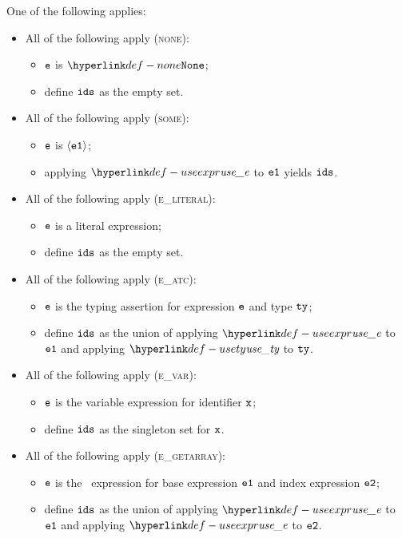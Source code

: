 \ProseParagraph
One of the following applies:
\begin{itemize}
  \item All of the following apply (\textsc{none}):
  \begin{itemize}
    \item $\texttt{e}$ is $\None$;
    \item define $\texttt{ids}$ as the empty set.
  \end{itemize}

  \item All of the following apply (\textsc{some}):
  \begin{itemize}
    \item $\texttt{e}$ is $\langle\texttt{e1}\rangle$;
    \item applying $\useexpr$ to $\texttt{e1}$ yields $\texttt{ids}$.
  \end{itemize}

  \item All of the following apply (\textsc{e\_literal}):
  \begin{itemize}
    \item $\texttt{e}$ is a literal expression;
    \item define $\texttt{ids}$ as the empty set.
  \end{itemize}

  \item All of the following apply (\textsc{e\_atc}):
  \begin{itemize}
    \item $\texttt{e}$ is the typing assertion for expression $\texttt{e}$ and type $\texttt{ty}$;
    \item define $\texttt{ids}$ as the union of applying $\useexpr$ to $\texttt{e1}$ and applying $\usety$ to $\texttt{ty}$.
  \end{itemize}

  \item All of the following apply (\textsc{e\_var}):
  \begin{itemize}
    \item $\texttt{e}$ is the variable expression for identifier $\texttt{x}$;
    \item define $\texttt{ids}$ as the singleton set for $\texttt{x}$.
  \end{itemize}

  \item All of the following apply (\textsc{e\_getarray}):
  \begin{itemize}
    \item $\texttt{e}$ is the \arrayaccess\ expression for base expression $\texttt{e1}$ and index expression $\texttt{e2}$;
    \item define $\texttt{ids}$ as the union of applying $\useexpr$ to $\texttt{e1}$ and applying $\useexpr$ to $\texttt{e2}$.
  \end{itemize}


\end{itemize}
